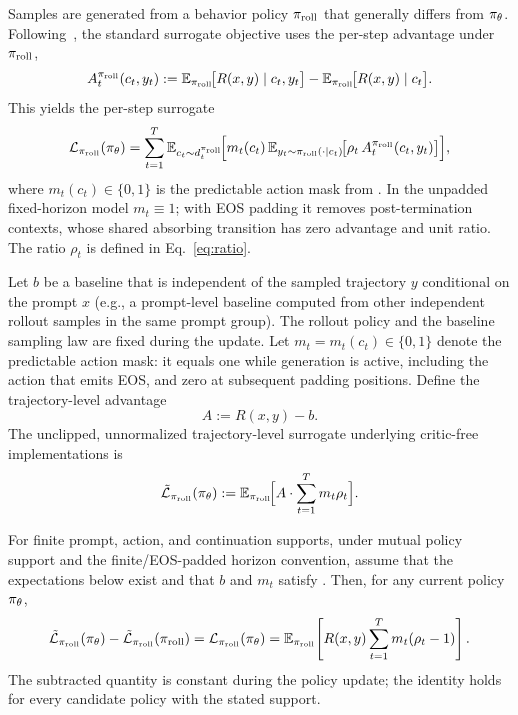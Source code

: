 Samples are generated from a behavior policy $\pi_{\mathrm{roll}}$ that generally differs from $\pi_{\theta}$. Following~\citet{kakade2002approximately},
the standard surrogate objective uses the per-step advantage under $\pi_{\mathrm{roll}}$,
\begin{equation*}
    A_t^{\pi_{\mathrm{roll}}}(c_t, y_t)
    := \mathbb{E}_{\pi_{\mathrm{roll}}}\!\big[R(x, y)\mid c_t, y_t\big] - \mathbb{E}_{\pi_{\mathrm{roll}}}\!\big[R(x, y)\mid c_t\big].
\end{equation*}
This yields the per-step surrogate
\begin{equation}
    \mathcal{L}_{\pi_{\mathrm{roll}}}(\pi_{\theta}) = \sum_{t=1}^T \mathbb{E}_{c_t \sim d_t^{\pi_{\mathrm{roll}}}}\!\Big[m_t(c_t)\,\mathbb{E}_{y_t \sim \pi_{\mathrm{roll}}(\cdot|c_t)}\!\big[\rho_t \, A_t^{\pi_{\mathrm{roll}}}(c_t, y_t)\big]\Big],
    \label{eq:surrogate}
\end{equation}
where $m_t(c_t)\in\{0,1\}$ is the predictable action mask from
. In the unpadded fixed-horizon model $m_t\equiv1$;
with EOS padding it removes post-termination contexts, whose shared absorbing
transition has zero advantage and unit ratio.
The ratio $\rho_t$ is defined in Eq.~\eqref{eq:ratio}.

\begin{definition}
\label{def:impl-surrogate}
Let $b$ be a baseline that is independent of the sampled trajectory $y$ conditional on the prompt $x$ (e.g., a prompt-level baseline
computed from other independent rollout samples in the same prompt group). The rollout policy and the baseline sampling law are fixed
during the update. Let $m_t=m_t(c_t)\in\{0,1\}$ denote the predictable action mask: it equals one while generation is active, including
the action that emits EOS, and zero at subsequent padding positions. Define the trajectory-level advantage
\begin{equation*}
    A := R(x, y) - b.
\end{equation*}
The unclipped, unnormalized trajectory-level surrogate underlying critic-free implementations is
\begin{equation*}
    \tilde{\mathcal{L}}_{\pi_{\mathrm{roll}}}(\pi_{\theta}) := \mathbb{E}_{\pi_{\mathrm{roll}}}\!\Big[A \cdot \sum_{t=1}^T m_t\rho_t\Big].
\end{equation*}
\end{definition}

\begin{proposition}
\label{prop:surrogate-equivalence}
For finite prompt, action, and continuation supports, under mutual policy support and the finite/EOS-padded horizon convention, assume that the expectations below exist and that $b$ and
$m_t$ satisfy . Then, for any current policy $\pi_{\theta}$,
\begin{equation}
    \tilde{\mathcal L}_{\pi_{\mathrm{roll}}}(\pi_{\theta})
    -\tilde{\mathcal L}_{\pi_{\mathrm{roll}}}(\pi_{\mathrm{roll}})
    =\mathcal L_{\pi_{\mathrm{roll}}}(\pi_{\theta})
    =\mathbb{E}_{\pi_{\mathrm{roll}}}\!\left[R(x,y)\sum_{t=1}^{T}m_t(\rho_t-1)\right].
    \label{eq:surrogate-equivalence}
\end{equation}
The subtracted quantity is constant during the policy update; the identity holds for every candidate policy with the stated support.
\end{proposition}


